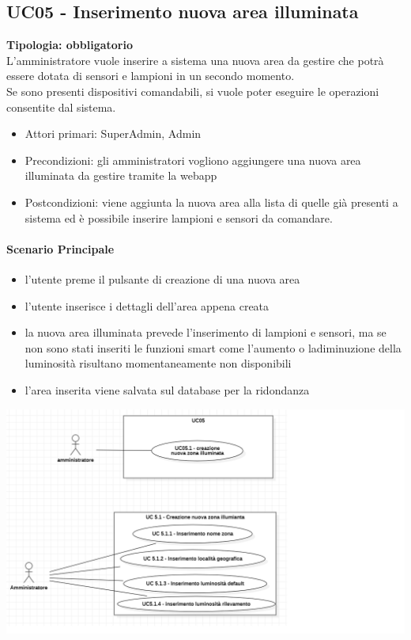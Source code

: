 \documentclass[12pt]{article}
\begin{document}
\subsection{UC05 - Inserimento nuova area illuminata}
\textbf{Tipologia: obbligatorio} \\
L'amministratore vuole inserire a sistema una nuova area da gestire che potrà essere dotata di sensori e lampioni in un secondo momento.\\
Se sono presenti dispositivi comandabili, si vuole poter eseguire le operazioni consentite dal sistema.
\begin{itemize}
	\item Attori primari: SuperAdmin, Admin
	\item Precondizioni: gli amministratori vogliono aggiungere una nuova area illuminata da gestire tramite la webapp
	\item Postcondizioni: viene aggiunta la nuova area alla lista di quelle già presenti a sistema ed è possibile inserire lampioni e sensori da comandare.
\end{itemize}
\paragraph{Scenario Principale}
\begin{itemize}
	\item l'utente preme il pulsante di creazione di una nuova area
	\item l'utente inserisce i dettagli dell'area appena creata
	\item la nuova area illuminata prevede l'inserimento di lampioni e sensori, ma se non sono stati inseriti le funzioni smart come l'aumento o ladiminuzione della luminosità risultano momentaneamente non disponibili
	\item l'area inserita viene salvata sul database per la ridondanza
\end{itemize}

\includegraphics[scale=0.5]{UC05.png}
\end{document}
